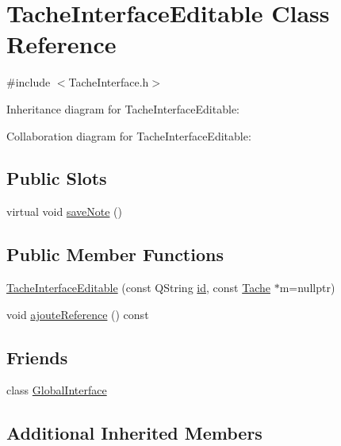 \hypertarget{classTacheInterfaceEditable}{}\section{Tache\+Interface\+Editable Class Reference}
\label{classTacheInterfaceEditable}


{\ttfamily \#include $<$Tache\+Interface.\+h$>$}



Inheritance diagram for Tache\+Interface\+Editable\+:


Collaboration diagram for Tache\+Interface\+Editable\+:
\subsection*{Public Slots}
\begin{DoxyCompactItemize}
\item 
virtual void \hyperlink{classTacheInterfaceEditable_a3330f73f98f2b5faddd6fc41bbe635b4}{save\+Note} ()
\end{DoxyCompactItemize}
\subsection*{Public Member Functions}
\begin{DoxyCompactItemize}
\item 
\hyperlink{classTacheInterfaceEditable_a970ff23b9cb698d75292f996d6c71365}{Tache\+Interface\+Editable} (const Q\+String \hyperlink{classNoteInterfaceEditable_a644ed9be4e9882c784a2667748d8501d}{id}, const \hyperlink{classTache}{Tache} $\ast$m=nullptr)
\item 
void \hyperlink{classTacheInterfaceEditable_aeedb2160392dd7cfc8f74f51eba96373}{ajoute\+Reference} () const 
\end{DoxyCompactItemize}
\subsection*{Friends}
\begin{DoxyCompactItemize}
\item 
class \hyperlink{classTacheInterfaceEditable_a2250a78aa5cceb79c3e34da3f1fe0fde}{Global\+Interface}
\end{DoxyCompactItemize}
\subsection*{Additional Inherited Members}


